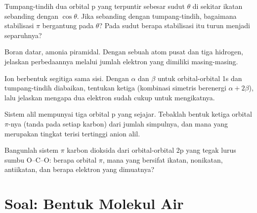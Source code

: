 \begin{exercise}[$\star\star$]\label{exo:b2:fragment-orbitals:8}
Tumpang-tindih dua orbital p yang terpuntir sebesar sudut $\theta$ di
sekitar ikatan sebanding dengan $\cos\theta$. Jika 
sebanding dengan tumpang-tindih, bagaimana stabilisasi $\pi$ bergantung
pada $\theta$? Pada sudut berapa stabilisasi itu turun menjadi separuhnya?
\end{exercise}

\begin{exercise}[$\star\star$]\label{exo:b2:fragment-orbitals:9}
Boran  datar, amonia piramidal. Dengan  sebuah atom
pusat dan tiga hidrogen, jelaskan perbedaannya melalui jumlah elektron
yang dimiliki masing-masing.
\end{exercise}

\begin{exercise}[$\star\star\star$]\label{exo:b2:fragment-orbitals:10}
Ion  berbentuk segitiga sama sisi. Dengan $\alpha$ dan $\beta$ untuk
orbital-orbital 1s dan tumpang-tindih diabaikan, tentukan ketiga  (kombinasi simetris berenergi $\alpha + 2\beta$), lalu jelaskan
mengapa dua elektron sudah cukup untuk mengikatnya.
\end{exercise}

\begin{exercise}[$\star\star\star$]\label{exo:b2:fragment-orbitals:11}
Sistem alil  mempunyai tiga orbital p yang sejajar. Tebaklah
bentuk ketiga orbital $\pi$-nya (tanda pada setiap karbon) dari jumlah
simpulnya, dan mana yang merupakan tingkat terisi tertinggi anion alil.
\end{exercise}

\begin{exercise}[$\star\star\star$]\label{exo:b2:fragment-orbitals:12}
Bangunlah sistem $\pi$ karbon dioksida dari orbital-orbital 2p yang tegak
lurus sumbu O--C--O: berapa orbital $\pi$, mana yang bersifat ikatan,
nonikatan, antiikatan, dan berapa elektron yang dimuatnya?
\end{exercise}

\clearpage
\enlargethispage{3\baselineskip}
\section{Soal: Bentuk Molekul Air}

